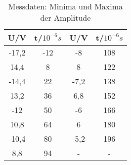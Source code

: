 \begin{table}[h!]
  \centering
  \caption{Messdaten: Minima und Maxima der Amplitude}
  \label{tab:amp}
  \begin{tabular}{c c c c}
    \toprule
    U/V & t/$10^{-6}s$ & U/V & t/$10^{-6}s$\\
    \midrule
    -17,2	& -12  &  -8	  & 108 \\
    14,4	& 8    &  8	    & 122 \\
    -14,4	& 22   &  -7,2	& 138 \\
    13,2	& 36   &  6,8 	& 152 \\
    -12	  & 50   &  -6	  & 166 \\
    10,8	& 64   &  6   	& 180 \\
    -10,4	& 80   &  -5,2	& 196 \\
    8,8	  & 94   &  -     &  -  \\
    \bottomrule
  \end{tabular}
\end{table}
